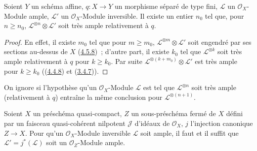 \begin{corollary}[4.5.11]
\label{II.4.5.11-fr}
Soient $Y$ un schéma affine, $q:X\to Y$ un morphisme séparé de type fini,
$\mathcal{L}$ un $\mathcal{O}_X$-Module ample, $\mathcal{L}'$ un
$\mathcal{O}_X$-Module inversible. Il existe un entier $n_0$ tel que, pour
$n\geq n_0$, $\mathcal{L}^{\otimes n}\otimes\mathcal{L}'$ soit très ample
relativement à $q$.
\end{corollary}

\begin{proof}
En effet, il existe $m_0$ tel que pour $m\geq m_0$,
$\mathcal{L}^{\otimes m}\otimes\mathcal{L}'$ soit engendré par ses sections
au-dessus de $X$ (\hyperref[II.4.5.8-fr]{4.5.8})~; d'autre part, il existe
$k_0$ tel que $\mathcal{L}^{\otimes k}$ soit très ample relativement à $q$
pour $k\geq k_0$. Par suite
$\mathcal{L}^{\otimes(k+m_0)}\otimes\mathcal{L}'$ est très ample pour
$k\geq k_0$ ((\hyperref[II.4.4.8-fr]{4.4.8}) et
(\hyperref[II.3.4.7-fr]{3.4.7})).
\end{proof}

\begin{remark}[4.5.12]
\label{II.4.5.12-fr}
On ignore si l'hypothèse qu'un $\mathcal{O}_X$-Module $\mathcal{L}$ est tel
que $\mathcal{L}^{\otimes n}$ soit très ample (relativement à $q$) entraîne
la même conclusion pour $\mathcal{L}^{\otimes(n+1)}$.
\end{remark}

\begin{proposition}[4.5.13]
\label{II.4.5.13-fr}
Soient $X$ un préschéma quasi-compact, $Z$ un sous-préschéma fermé de $X$
défini par un faisceau quasi-cohérent nilpotent $\mathcal{J}$ d'idéaux de
$\mathcal{O}_X$, $j$ l'injection canonique $Z\to X$. Pour qu'un
$\mathcal{O}_X$-Module inversible $\mathcal{L}$ soit ample, il faut et il
suffit que $\mathcal{L}'=j^*(\mathcal{L})$ soit un
$\mathcal{O}_Z$-Module ample.
\end{proposition}

